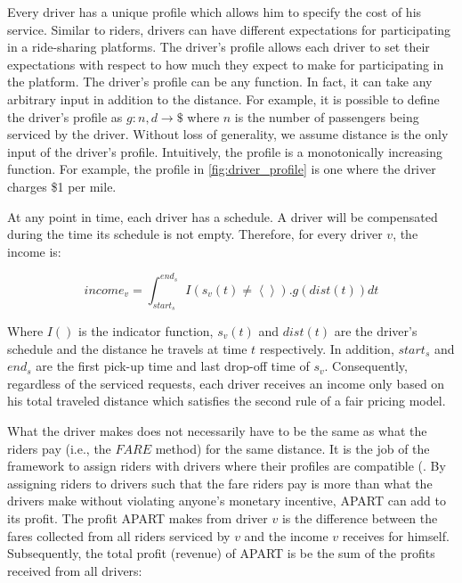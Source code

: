 Every driver has a unique profile which allows him to specify the cost of his service. Similar to riders, drivers can have different expectations for participating in a ride-sharing platforms. The driver's profile allows each driver to set their expectations with respect to how much they expect to make for participating in the platform. The driver's profile can be any function. In fact, it can take any arbitrary input in addition to the distance. For example, it is possible to define the driver's profile as $g: n, d \rightarrow \$$ where $n$ is the number of passengers being serviced by the driver. Without loss of generality, we assume distance is the only input of the driver's profile. Intuitively, the profile is a monotonically increasing function. For example, the profile in \cref{fig:driver_profile} is one where the driver charges \$1 per mile.

At any point in time, each driver has a schedule. A driver will be compensated during the time its schedule is not empty. Therefore, for every driver $v$, the income is:

\begin{equation}
\label{eq:payment}
income_v = \int_{start_s}^{end_s} I\left( s_v(t) \neq \left\langle \right\rangle\right).g(dist(t))dt
\end{equation}

\noindent Where $I()$ is the indicator function, $s_v(t)$ and $dist(t)$ are the driver's schedule and the distance he travels at time $t$ respectively. In addition, $start_s$ and $end_s$ are the first pick-up time and last drop-off time of $s_v$. Consequently, regardless of the serviced requests, each driver receives an income only based on his total traveled distance which satisfies the second rule of a fair pricing model.

What the driver makes does not necessarily have to be the same as what the riders pay (i.e., the $FARE$ method) for the same distance. It is the job of the framework to assign riders with drivers where their profiles are compatible (. By assigning riders to drivers such that the fare riders pay is more than what the drivers make without violating anyone's monetary incentive, APART can add to its profit. The profit APART makes from driver $v$ is the difference between the fares collected from all riders serviced by $v$ and the income $v$ receives for himself. Subsequently, the total profit (revenue) of APART is be the sum of the profits received from all drivers:

